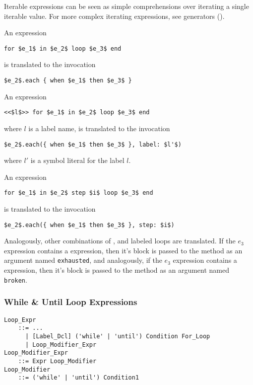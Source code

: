 Iterable expressions can be seen as simple comprehensions over iterating a single iterable value. For more complex iterating expressions, see generators ().

An expression 
\begin{lstlisting}
for $e_1$ in $e_2$ loop $e_3$ end
\end{lstlisting} 
is translated to the invocation
\begin{lstlisting}
$e_2$.each { when $e_1$ then $e_3$ }
\end{lstlisting} 

An expression 
\begin{lstlisting}
<<$l$>> for $e_1$ in $e_2$ loop $e_3$ end
\end{lstlisting} 
where $l$ is a label name, is translated to the invocation
\begin{lstlisting}[deletekeywords={label}]
$e_2$.each({ when $e_1$ then $e_3$ }, label: $l'$)
\end{lstlisting}
where $l'$ is a symbol literal for the label $l$. 

An expression 
\begin{lstlisting}
for $e_1$ in $e_2$ step $i$ loop $e_3$ end
\end{lstlisting} 
is translated to the invocation
\begin{lstlisting}[deletekeywords={step}]
$e_2$.each({ when $e_1$ then $e_3$ }, step: $i$)
\end{lstlisting} 

Analogously, other combinations of ,  and labeled loops are translated. If the $e_3$ expression contains a  expression, then it's block is passed to the  method as an argument named \lstinline[deletekeywords={exhausted}]{exhausted}, and analogously, if the $e_3$ expression contains a  expression, then it's block is passed to the  method as an argument named \lstinline[deletekeywords={broken}]{broken}.







\subsubsection{While \& Until Loop Expressions}

\grammar\begin{lstlisting}
Loop_Expr
    ::= ...
      | [Label_Dcl] ('while' | 'until') Condition For_Loop
      | Loop_Modifier_Expr
Loop_Modifier_Expr 
    ::= Expr Loop_Modifier
Loop_Modifier 
    ::= ('while' | 'until') Condition1
\end{lstlisting}

